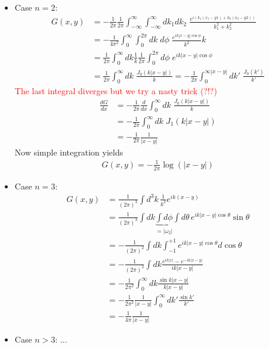 \documentclass[10pt,a4paper]{article}
\theoremstyle{definition}
\begin{document}
\begin{itemize}
\begin{center}
        \end{center}
        \item Case $n=2$:
        \begin{align}
            G(x,y)&=-\frac{1}{2\pi}\frac{1}{2\pi}\int_{-\infty}^\infty \int_{-\infty}^\infty dk_1 dk_2\; \frac{e^{i(k_1(x_1-y1)+k_2(x_2-y2))}}{k_1^2+k_2^2}\\
            &=-\frac{1}{4\pi^2}\int_{0}^\infty \int_{0}^{2\pi} dk\;d\phi\; \frac{e^{ik |x-y|\cos\phi}}{k^2}k\\
            &=\frac{1}{2\pi}\int_{0}^\infty dk \frac{1}{k}\frac{1}{2\pi}\int_{0}^{2\pi} d\phi\; e^{ik |x-y|\cos\phi}\\
            &=\frac{1}{2\pi}\int_{0}^\infty dk \; \frac{J_0(k|x-y|)}{k}=-\frac{1}{2\pi}\int_{0}^{\infty|x-y|} dk' \; \frac{J_0(k')}{k'}
        \end{align}
        \textcolor{red}{The last integral diverges but we try a nasty trick (?!?)}
        \begin{align}
            \frac{dG}{dx}&=-\frac{1}{2\pi}\frac{d}{dx}\int_{0}^{\infty} dk \; \frac{J_0(k|x-y|)}{k}\\
            &=-\frac{1}{2\pi}\int_{0}^{\infty} dk \; J_1(k|x-y|)\\
            &=-\frac{1}{2\pi}\frac{1}{|x-y|}
        \end{align}
        Now simple integration yields
        \begin{align}
            G(x,y)=-\frac{1}{2\pi}\log(|x-y|)
        \end{align}
        \item Case $n=3$:
        \begin{align}
            G(x,y)&=\frac{1}{(2\pi)^{3}}\int d^3k\,\frac{1}{k^2}e^{ik(x-y)}\\
            &=\frac{1}{(2\pi)^{3}}\int dk\underbrace{\int d\phi}_{=|\omega_2|} \int d\theta\,e^{ik|x-y|\cos\theta}\sin\theta\\
            &=-\frac{1}{(2\pi)^{2}}\int dk \int_{-1}^{+1} e^{ik|x-y|\cos\theta}d\cos\theta\\
            &=-\frac{1}{(2\pi)^{2}}\int dk \frac{e^{ik|x|}-e^{-ik|x-y|}}{ik|x-y|}\\
            &=-\frac{1}{2\pi^2}\int_0^\infty dk \frac{\sin k|x-y|}{k|x-y|}\\
            &=-\frac{1}{2\pi^2}\frac{1}{|x-y|}\int_0^\infty dk' \frac{\sin k'}{k'}\\
            &=-\frac{1}{4\pi}\frac{1}{|x-y|}
        \end{align}
        \item Case $n>3$:
        ...
        
    \end{itemize}
\end{document}
